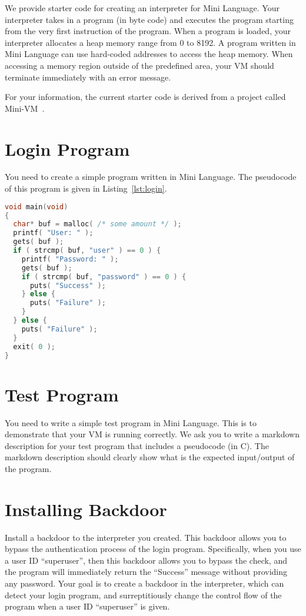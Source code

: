 \documentclass[a4paper, 11pt]{article}
\theoremstyle{definition}
\begin{document}
{We provide starter code for creating an interpreter for Mini Language.
Your interpreter takes in a program (in byte code) and executes the
program starting from the very first instruction of the program. When
a program is loaded, your interpreter allocates a heap memory range
from 0 to 8192. A program written in Mini Language can use hard-coded
addresses to access the heap memory. When accessing a memory region
outside of the predefined area, your VM should terminate immediately
with an error message.

For your information, the current starter code is derived from a
project called Mini-VM~\cite{minivm}.

\section{Login Program}

You need to create a simple program written in Mini Language. The
pseudocode of this program is given in Listing~\ref{lst:login}.

\begin{lstlisting}[language=C,
                   caption={Pseudocode for Login Program.},
                   label=lst:login,
                   basicstyle=\footnotesize\ttfamily]
void main(void)
{
  char* buf = malloc( /* some amount */ );
  printf( "User: " );
  gets( buf );
  if ( strcmp( buf, "user" ) == 0 ) {
    printf( "Password: " );
    gets( buf );
    if ( strcmp( buf, "password" ) == 0 ) {
      puts( "Success" );
    } else {
      puts( "Failure" );
    }
  } else {
    puts( "Failure" );
  }
  exit( 0 );
}
\end{lstlisting}

\section{Test Program}

You need to write a simple test program in Mini Language. This is to
demonstrate that your VM is running correctly. We ask you to write a
markdown description for your test program that includes a pseudocode
(in C). The markdown description should clearly show what is the
expected input/output of the program.

\section{Installing Backdoor}

Install a backdoor to the interpreter you created. This backdoor
allows you to bypass the authentication process of the login program.
Specifically, when you use a user ID ``superuser'', then this backdoor
allows you to bypass the check, and the program will immediately
return the ``Success'' message without providing any password. Your
goal is to create a backdoor in the interpreter, which can detect your
login program, and surreptitiously change the control flow of the
program when a user ID ``superuser'' is given.

}
\end{document}
